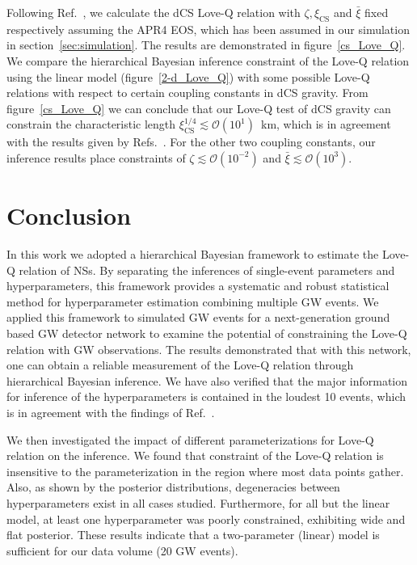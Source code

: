 \documentclass[a4paper,11pt]{article}
\begin{document}
Following Ref.~\cite{Yagi_2017}, we calculate the dCS Love-Q relation with $\zeta, \xi_{\mathrm{CS}}$ and $\bar{\xi}$ 
fixed respectively assuming the APR4 EOS, which has been assumed in our simulation 
in section~\ref{sec:simulation}. The results are demonstrated in figure~\ref{cs_Love_Q}. 
We compare the hierarchical Bayesian inference constraint of the Love-Q relation 
using the linear model (figure~\ref{2-d_Love_Q}) with some possible Love-Q 
relations with respect to certain coupling constants in dCS gravity. From 
figure~\ref{cs_Love_Q} we can conclude that our Love-Q test of dCS gravity can 
constrain the characteristic length $\xi_{\mathrm{CS}}^{1/4} \lesssim \mathcal{O}(10^1)$~km, 
which is in agreement with the results given by Refs.~\cite{Yagi:2013bca,Yagi:2013awa}. 
For the other two coupling constants, our inference results place constraints of 
$\zeta \lesssim \mathcal{O}(10^{-2})$ and $\bar{\xi} \lesssim \mathcal{O}(10^{3})$.

\section{Conclusion}
\label{sec:conclusion}

In this work we adopted a hierarchical Bayesian framework to estimate the Love-Q 
relation of NSs. By separating the inferences of single-event parameters and 
hyperparameters, this framework provides a systematic and robust statistical 
method for hyperparameter estimation combining multiple GW events. We applied this 
framework to simulated GW events for a next-generation ground based GW detector 
network to examine the potential of constraining the Love-Q relation with GW 
observations. The results demonstrated that with this network, one can obtain a 
reliable measurement of the Love-Q relation through hierarchical Bayesian 
inference. We have also verified that the major information for inference of the 
hyperparameters is contained in the loudest 10 events, which is in agreement with the findings of Ref.~\cite{Lackey:2014fwa}.

We then investigated the impact of different parameterizations for Love-Q relation 
on the inference. We found that constraint of the Love-Q relation is insensitive 
to the parameterization in the region where most data points gather. Also, as 
shown by the posterior distributions, degeneracies between hyperparameters exist 
in all cases studied. Furthermore, for all but the linear model, at least one 
hyperparameter was poorly constrained, exhibiting wide and flat posterior. These 
results indicate that a two-parameter (linear) model is sufficient for our data volume (20 GW events).
\end{document}
